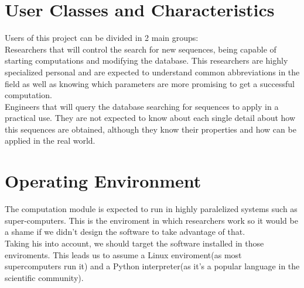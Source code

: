 \documentclass{scrreprt}
\begin{document}
\section{User Classes and Characteristics}

Users of this project can be divided in 2 main groups:\\

Researchers that will control the search for new sequences, being capable of
starting computations and modifying the database. This researchers are highly
specialized personal and are expected to understand common abbreviations in
the field as well as knowing which parameters are more promising to get a
successful computation.\\

Engineers that will query the database searching for sequences to apply in
a practical use. They are not expected to know about each single detail about
how this sequences are obtained, although they know their properties and how
can be applied in the real world.\\

\section{Operating Environment}

The computation module is expected to run in highly paralelized systems such
as super-computers. This is the enviroment in which researchers work so it
would be a shame if we didn't design the software to take advantage of
that.\\

Taking his into account, we should target the software installed in those
enviroments. This leads us to assume a Linux enviroment(as most supercomputers
run it) and a Python interpreter(as it's a popular language in the scientific
community).\\


\end{document}
